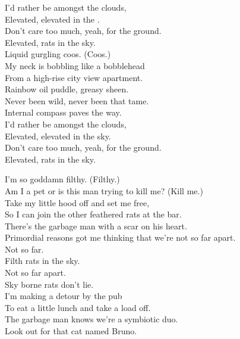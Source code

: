 


I'd rather be amongst the clouds, \\
Elevated, elevated in the . \\
Don't care too much, yeah, for the ground. \\
Elevated, rats in the sky. \\

Liquid gurgling coos. (Coos.) \\
My neck is bobbling like a bobblehead \\
From a high-rise city view apartment. \\
Rainbow oil puddle, greasy sheen. \\
Never been wild, never been that tame. \\
Internal compass paves the way. \\

I'd rather be amongst the clouds, \\
Elevated, elevated in the sky. \\
Don't care too much, yeah, for the ground. \\
Elevated, rats in the sky. \\


I'm so goddamn filthy. (Filthy.) \\
Am I a pet or is this man trying to kill me? (Kill me.) \\
Take my little hood off and set me free, \\
So I can join the other feathered rats at the bar. \\
There's the garbage man with a scar on his heart. \\
Primordial reasons got me thinking that we're not so far apart. \\

Not so far. \\
Filth rats in the sky. \\
Not so far apart. \\
Sky borne rats don't lie. \\

I'm making a detour by the pub \\
To eat a little lunch and take a load off. \\
The garbage man knows we're a symbiotic duo. \\
Look out for that cat named Bruno. \\

